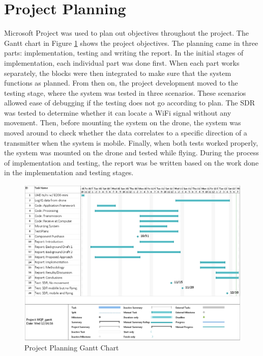 \section{Project Planning}
Microsoft Project was used to plan out objectives throughout the project. The Gantt chart in Figure \ref{fig:gantt_chart} shows the project objectives. The planning came in three parts: implementation, testing and writing the report. In the initial stages of implementation, each individual part was done first. When each part works separately, the blocks were then integrated to make sure that the system functions as planned. From then on, the project development moved to the testing stage, where the system was tested in three scenarios. These scenarios allowed ease of debugging if the testing does not go according to plan. The SDR was tested to determine whether it can locate a WiFi signal without any movement. Then, before mounting the system on the drone, the system was moved around to check whether the data correlates to a specific direction of a transmitter when the system is mobile. Finally, when both tests worked properly, the system was mounted on the drone and tested while flying. During the process of implementation and testing, the report was be written based on the work done in the implementation and testing stages.
\begin{figure}[ht]
\centering
\includegraphics[width=\textwidth]{img/oct_gantt_chart.png}
\caption{Project Planning Gantt Chart}
\label{fig:gantt_chart}
\end{figure}
